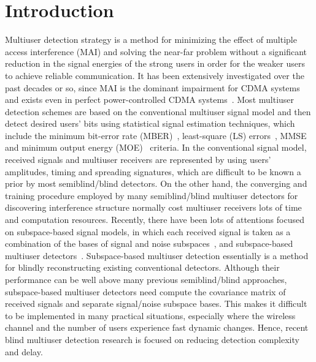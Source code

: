 \documentclass[a4paper,10pt,fleqn, twocolumn]{IEEETran}
\begin{document}
\section{Introduction}
Multiuser detection strategy is a method for minimizing the effect
of multiple access interference (MAI) and solving the near-far
problem without a significant reduction in the signal energies of
the strong users in order for the weaker users to achieve reliable
communication. It has been extensively investigated over the past
decades or so, since MAI is the dominant impairment for CDMA
systems and exists even in perfect power-controlled CDMA
systems~\cite{Verd86,Verd89,Lupa89,Madh94,Honi95,Wang98,Verd98,Wang99}.
Most multiuser detection schemes are based on the conventional
multiuser signal model and then detect desired users' bits using
statistical signal estimation techniques, which include the
minimum bit-error rate (MBER)~\cite{Verd86,Verd89}, least-square
(LS) errors~\cite{Lupa89}, MMSE~\cite{Lupa89,Madh94,Honi95} and
minimum output energy (MOE)~\cite{Honi95} criteria. In the
conventional signal model, received signals and multiuser
receivers are represented by using users' amplitudes, timing and
spreading signatures, which are difficult to be known a prior by
most semiblind/blind detectors. On the other hand, the converging
and training procedure employed by many semiblind/blind multiuser
detectors for discovering interference structure normally cost
multiuser receivers lots of time and computation resources.
Recently, there have been lots of attentions focused on
subspace-based signal models, in which each received signal is
taken as a combination of the bases of signal and noise
subspaces~\cite{Yang95,Liu96,Torl97}, and subspace-based multiuser
detectors~\cite{Wang98,Wang99}. Subspace-based multiuser detection
essentially is a method for blindly reconstructing existing
conventional detectors. Although their performance can be well
above many previous semiblind/blind approaches, subspace-based
multiuser detectors need compute the covariance matrix of received
signals and separate signal/noise subspace bases. This makes it
difficult to be implemented in many practical situations,
especially where the wireless channel and the number of users
experience fast dynamic changes. Hence, recent blind multiuser
detection research is focused on reducing detection complexity and
delay.
\end{document}
